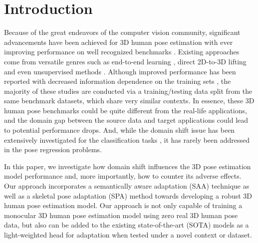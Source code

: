 \documentclass[twocolumn]{svjour3}          \smartqed  \usepackage{graphicx}
\begin{document}
\section{Introduction}
\label{sec:intro}
Because of the great endeavors of the computer vision community, significant advancements have been achieved for 3D human pose estimation with ever improving performance on well recognized benchmarks \cite{h36m_pami}. 
Existing approaches come from versatile genres such as end-to-end learning \cite{li20143d}, direct 2D-to-3D lifting \cite{martinez2017simple} and even unsupervised methods \cite{chen2019unsupervised}. Although improved performance has been reported with decreased information dependence on the training sets \cite{martinez2017simple,chen2019unsupervised}, the majority of these studies are conducted via a training/testing data split from the same benchmark datasets, which share very similar contexts. 
In essence, these 3D human pose benchmarks could be quite different from the real-life applications, and the domain gap between the source data and target applications could lead to potential performance drops. 
And, while the domain shift issue has been extensively investigated for the classification tasks \cite{ganin2016domain,tzeng2015simultaneous}, it has rarely been addressed in the pose regression problems. 

In this paper, we investigate how domain shift influences the 3D pose estimation model  performance and, more importantly, how to counter its adverse effects. Our approach  incorporates a semantically aware adaptation (SAA) technique as well as a skeletal pose adaptation (SPA) method towards developing a robust 3D human pose estimation model. Our approach is not only capable of training a monocular 3D human pose estimation model using zero real 3D human pose data, but also can be  added to the existing state-of-the-art (SOTA) models as a light-weighted head for adaptation when tested under a novel context or dataset. 
\end{document}
